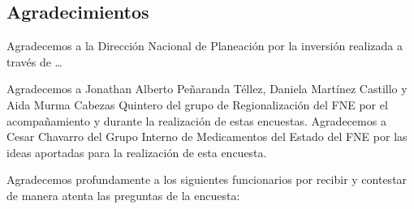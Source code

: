 \documentclass[
]{book}
\begin{document}
\hypertarget{agradecimientos}{%
\subsection*{Agradecimientos}\label{agradecimientos}}

Agradecemos a la Dirección Nacional de Planeación por la inversión realizada a través de \ldots{}

Agradecemos a Jonathan Alberto Peñaranda Téllez, Daniela Martínez Castillo y Aida Murma Cabezas Quintero del grupo de Regionalización del FNE por el acompañamiento y durante la realización de estas encuestas. Agradecemos a Cesar Chavarro del Grupo Interno de Medicamentos del Estado del FNE por las ideas aportadas para la realización de esta encuesta.

Agradecemos profundamente a los siguientes funcionarios por recibir y contestar de manera atenta las preguntas de la encuesta:
\end{document}
